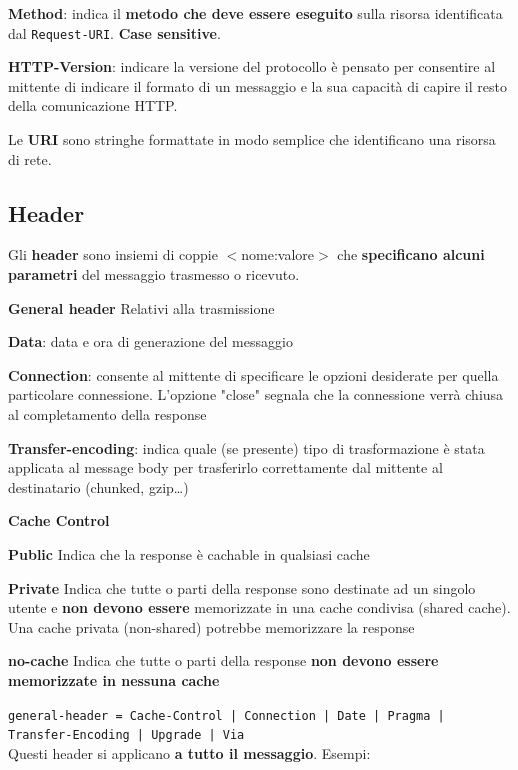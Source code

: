 \documentclass[10pt]{article}
\begin{document}
\begin{list}{}{}
\item \textbf{Method}: indica il \textbf{metodo che deve essere eseguito} sulla risorsa identificata dal \texttt{Request-URI}. \textbf{Case sensitive}.
\item \textbf{HTTP-Version}: indicare la versione del protocollo è pensato per consentire al mittente di indicare il formato di un messaggio e la sua capacità di capire il resto della comunicazione HTTP.
\item Le \textbf{URI} sono stringhe formattate in modo semplice che identificano una risorsa di rete.
\subsection{Header}
Gli \textbf{header} sono insiemi di coppie $<$nome:valore$>$ che \textbf{specificano alcuni parametri} del messaggio trasmesso o ricevuto.
\begin{list}{}{}
\item \textbf{General header} Relativi alla trasmissione
\begin{list}{}{}
\item \textbf{Data}: data e ora di generazione del messaggio
\item \textbf{Connection}: consente al mittente di specificare le opzioni desiderate per quella particolare connessione. L'opzione "close" segnala che la connessione verrà chiusa al completamento della response
\item \textbf{Transfer-encoding}: indica quale (se presente) tipo di trasformazione è stata applicata al message body per trasferirlo correttamente dal mittente al destinatario (chunked, gzip\ldots)
\item \textbf{Cache Control}
\begin{list}{}{}
\item \textbf{Public} Indica che la response è cachable in qualsiasi cache
\item \textbf{Private} Indica che tutte o parti della response sono destinate ad un singolo utente e \textbf{non devono essere} memorizzate in una cache condivisa (shared cache). Una cache privata (non-shared) potrebbe memorizzare la response
\item \textbf{no-cache} Indica che tutte o parti della response \textbf{non devono essere memorizzate in nessuna cache}
\end{list}
\end{list}
\texttt{general-header = Cache-Control | Connection | Date | Pragma | Transfer-Encoding | Upgrade | Via}\\Questi header si applicano \textbf{a tutto il messaggio}. Esempi:

\end{list}
\end{list}
\end{document}
